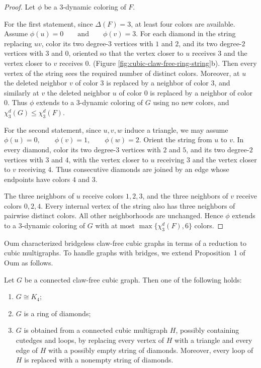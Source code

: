 \begin{proof}
Let $\phi$ be a $3$-dynamic coloring of $F$.

For the first statement, since $\Delta(F)=3$, at least four colors are
available. Assume
$
\phi(u)=0
\qquad\text{and}\qquad
\phi(v)=3.
$
For each diamond in the string replacing $uv$, color its two degree-$3$
vertices with $1$ and $2$, and its two degree-$2$ vertices with $3$ and
$0$, oriented so that the vertex closer to $u$ receives $3$ and the
vertex closer to $v$ receives $0$.
(Figure \ref{fig:cubic-claw-free-ring-string}b).
Then every vertex of the string sees the required number of distinct
colors. Moreover, at $u$ the deleted neighbor $v$ of color $3$ is
replaced by a neighbor of color $3$, and similarly at $v$ the deleted
neighbor $u$ of color $0$ is replaced by a neighbor of color $0$.
Thus $\phi$ extends to a $3$-dynamic coloring of $G$ using no new
colors, and
$
\chi_3^d(G)\leq\chi_3^d(F).
$

For the second statement, 
since $u,v,w$ induce a triangle,
we may assume
$
\phi(u)=0,\qquad
\phi(v)=1,\qquad
\phi(w)=2.
$
Orient the string from $u$ to $v$. In every diamond, color its two
degree-$3$ vertices with $2$ and $5$, and its two degree-$2$ vertices
with $3$ and $4$, with the vertex closer to $u$ receiving $3$ and the
vertex closer to $v$ receiving $4$. Thus consecutive diamonds are
joined by an edge whose endpoints have colors $4$ and $3$.

The three neighbors of $u$ receive colors $1,2,3$, and the three
neighbors of $v$ receive colors $0,2,4$. Every internal vertex of the
string also has three neighbors of pairwise distinct colors. All other neighborhoods are unchanged.
Hence $\phi$ extends to a $3$-dynamic coloring of $G$ with at most
$\max\{\chi_3^d(F),6\}$ colors.
\end{proof}


Oum characterized bridgeless claw-free cubic graphs in terms of a reduction to cubic multigraphs. To handle graphs with bridges, we extend Proposition~1 of Oum \cite{Oum2011} as follows.

\begin{proposition} \label{prop:oum-extended}
Let $G$ be a connected claw-free cubic graph. Then one of the
following holds:
\begin{enumerate}
    \item $G\cong K_4$;
    \item $G$ is a ring of diamonds;
    \item $G$ is obtained from a connected cubic multigraph $H$,
    possibly containing cutedges and loops, by replacing every
    vertex of $H$ with a triangle and every edge of $H$ with a
    possibly empty string of diamonds. Moreover, every loop of $H$
    is replaced with a nonempty string of diamonds.
\end{enumerate}
\end{proposition}

